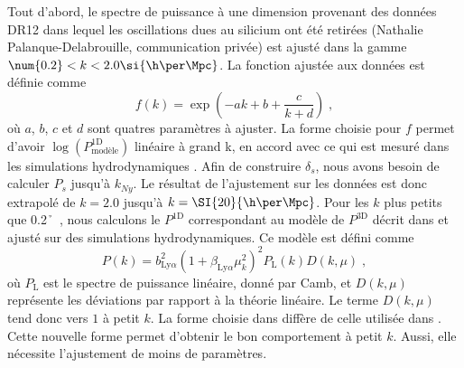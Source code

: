 Tout d'abord, le spectre de puissance à une dimension provenant des données DR12 dans lequel les oscillations dues au silicium ont été retirées (Nathalie Palanque-Delabrouille, communication privée) est ajusté dans la gamme $\num{0.2} < k < {2.0} \si{\h\per\Mpc}$.
La fonction ajustée aux données est définie comme
\begin{equation}
  \label{eq:p1d_data}
  f(k) = \exp(- a k + b + \frac{c}{k + d})  \; ,
\end{equation}
où $a$, $b$, $c$ et $d$ sont quatres paramètres à ajuster.
La forme choisie pour $f$ permet d'avoir $\log(P^{\mathrm{1D}}_{\mathrm{modèle}})$ linéaire à grand k, en accord avec ce qui est mesuré dans les simulations hydrodynamiques \autocite{Arinyo-i-Prats2015}.
Afin de construire $\delta_s$, nous avons besoin de calculer $P_{s}$ jusqu'à $k_{Ny}$.
Le résultat de l'ajustement sur les données est donc extrapolé de $k = \num{2.0}$ jusqu'à $k = \SI{20}{\h\per\Mpc}$.
Pour les $k$ plus petits que \SI{0.2}{\h\per\Mpc}, nous calculons le $P^{\mathrm{1D}}$ correspondant au modèle de $P^{\mathrm{3D}}$ décrit dans \textcite{Arinyo-i-Prats2015} et ajusté sur des simulations hydrodynamiques.
Ce modèle est défini comme
\begin{equation}
  P(k) = b_{\mathrm{Ly}\alpha}^2 (1 + \beta_{\mathrm{Ly}\alpha} \mu_k^2)^2 P_{\mathrm{L}}(k) D(k, \mu) \; ,
\end{equation}
où $P_{\mathrm{L}}$ est le spectre de puissance linéaire, donné par Camb, et $D(k,\mu)$ représente les déviations par rapport à la théorie linéaire. Le terme $D(k,\mu)$ tend donc vers $1$ à petit $k$. La forme choisie dans \textcite{Arinyo-i-Prats2015} diffère de celle utilisée dans \textcite{McDonald2003}. Cette nouvelle forme permet d'obtenir le bon comportement à petit $k$. Aussi, elle nécessite l'ajustement de moins de paramètres.
